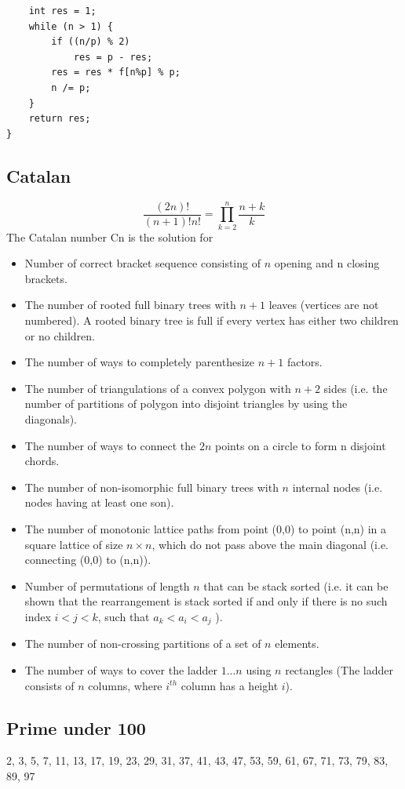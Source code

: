 \documentclass[A4 paper, 12pt, oneside, landscape]{article}
\begin{document}
\begin{multicols}{2}
\begin{lstlisting}
    int res = 1;
    while (n > 1) {
        if ((n/p) % 2)
            res = p - res;
        res = res * f[n%p] % p;
        n /= p;
    }
    return res; 
}
    \end{lstlisting}

	\subsection{Catalan}
	\[\frac{(2n)!}{(n + 1)!n!} = \prod_{k = 2}^n \frac{n + k}{k} \]
	The Catalan number Cn is the solution for
	\begin{itemize}
	    \item Number of correct bracket sequence consisting of $n$ opening and n closing brackets.
	    \item The number of rooted full binary trees with $n+1$ leaves (vertices are not numbered). A rooted binary tree is full if every vertex has either two children or no children.
	    \item The number of ways to completely parenthesize $n+1$ factors.
	    \item The number of triangulations of a convex polygon with $n+2$ sides (i.e. the number of partitions of polygon into disjoint triangles by using the diagonals).
	    \item The number of ways to connect the $2n$ points on a circle to form n disjoint chords.
	    \item The number of non-isomorphic full binary trees with $n$ internal nodes (i.e. nodes having at least one son).
	    \item The number of monotonic lattice paths from point (0,0) to point (n,n) in a square lattice of size $n \times n$, which do not pass above the main diagonal (i.e. connecting (0,0) to (n,n)).
	    \item Number of permutations of length $n$ that can be stack sorted (i.e. it can be shown that the rearrangement is stack sorted if and only if there is no such index $i<j<k$, such that $a_k<a_i<a_j$ ).
	    \item The number of non-crossing partitions of a set of $n$ elements.
        \item The number of ways to cover the ladder $1...n$ using $n$ rectangles (The ladder consists of $n$ columns, where $i^{th}$ column has a height $i$).
	\end{itemize}

	\subsection{Prime under 100}
	2, 3, 5, 7, 11, 13, 17, 19, 23, 29, 31, 37, 41, 43, 47, 53, 59, 61, 67, 71, 73, 79, 83, 89, 97 
	

\end{multicols}
\end{document}
